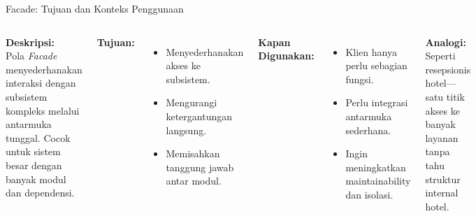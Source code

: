 \documentclass[aspectratio=169, table]{beamer}
\begin{document}
\begin{frame}{Facade: Tujuan dan Konteks Penggunaan}
	\vspace{20pt}
	\begin{columns}[T]
		\textbf{Deskripsi:} \\
		Pola \textit{Facade} menyederhanakan interaksi dengan subsistem kompleks melalui antarmuka tunggal. Cocok untuk sistem besar dengan banyak modul dan dependensi.
		
		\vspace{8pt}
		\textbf{Tujuan:}
		\begin{itemize}
			\item Menyederhanakan akses ke subsistem.
			\item Mengurangi ketergantungan langsung.
			\item Memisahkan tanggung jawab antar modul.
		\end{itemize}
		
		\textbf{Kapan Digunakan:}
		\begin{itemize}
			\item Klien hanya perlu sebagian fungsi.
			\item Perlu integrasi antarmuka sederhana.
			\item Ingin meningkatkan maintainability dan isolasi.
		\end{itemize}
		
		\vspace{6pt}
		\textbf{Analogi:} \\
		Seperti resepsionis hotel—satu titik akses ke banyak layanan tanpa tahu struktur internal hotel.
	\end{columns}
\end{frame}
\end{document}
